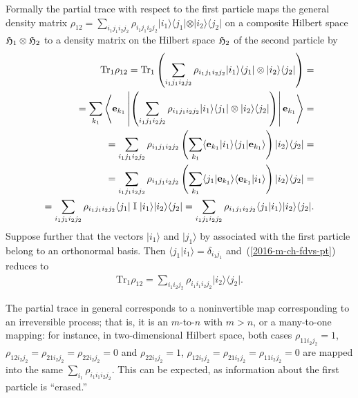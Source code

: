 Formally the partial trace with respect to the first particle
maps the general density matrix
${ \rho}_{12} = \sum_{i_1 j_1 i_2 j_2} \rho_{i_1 j_1 i_2 j_2}   \vert i_1\rangle \langle j_1\vert \otimes \vert i_2\rangle \langle j_2 \vert$
on a composite Hilbert space
$
{\frak H}_1
\otimes
{\frak H}_2
$
to  a density matrix on the Hilbert space
${\frak H}_2
$ of the second particle by
\begin{equation}
\begin{split}
\textrm{Tr}_1
{ \rho}_{12}
= \textrm{Tr}_1  \left(   \sum_{i_1 j_1 i_2 j_2} \rho_{i_1 j_1 i_2 j_2}   \vert i_1\rangle \langle j_1\vert \otimes \vert i_2 \rangle \langle j_2 \vert \right)
=\\
= \sum_{k_1}   \left\langle {\bf e}_{k_1}  \left\vert \left(   \sum_{i_1 j_1 i_2 j_2} \rho_{i_1 j_1 i_2 j_2}
 \vert i_1\rangle \langle j_1\vert \otimes \vert i_2 \rangle \langle j_2 \vert  \right)  \right\vert {\bf e}_{k_1} \right\rangle
=\\
=  \sum_{i_1 j_1 i_2 j_2} \rho_{i_1 j_1 i_2 j_2}  \left( \sum_{k_1}
 \langle {\bf e}_{k_1}  \vert i_1\rangle \langle j_1\vert    {\bf e}_{k_1}  \rangle  \right)  \vert i_2 \rangle \langle j_2 \vert
=\\
=  \sum_{i_1 j_1 i_2 j_2} \rho_{i_1 j_1 i_2 j_2}  \left( \sum_{k_1}
 \langle j_1\vert    {\bf e}_{k_1}  \rangle  \langle {\bf e}_{k_1}  \vert i_1\rangle \right)  \vert i_2 \rangle \langle j_2 \vert
=\\
=  \sum_{i_1 j_1 i_2 j_2} \rho_{i_1 j_1 i_2 j_2}
 \langle j_1\vert   \; {\Bbb I} \; \vert i_1\rangle   \vert i_2 \rangle \langle j_2 \vert
=  \sum_{i_1 j_1 i_2 j_2} \rho_{i_1 j_1 i_2 j_2}
 \langle j_1 \vert  i_1\rangle    \vert i_2 \rangle \langle j_2 \vert
.
\end{split}
\label{2016-m-ch-fdvs-pt}
\end{equation}
Suppose further that the vectors
$\vert i_1 \rangle$
and
$\vert j_1 \rangle$
by   associated with the first particle
belong to an orthonormal basis.
Then $\langle j_1 \vert  i_1\rangle =\delta_{i_1 j_1}$ and~(\ref{2016-m-ch-fdvs-pt})
reduces to
\begin{equation}
\begin{split}
\textrm{Tr}_1
{ \rho}_{12}
=  \sum_{i_1 i_2 j_2} \rho_{i_1 i_1 i_2 j_2}
  \vert i_2 \rangle \langle j_2 \vert
.
\end{split}
\label{2016-m-ch-fdvs-pt2}
\end{equation}

The partial trace in general corresponds to a noninvertible map corresponding to an irreversible process; that is,
it is an $m$-to-$n$ with $m>n$, or a many-to-one mapping:
for instance, in two-dimensional Hilbert space, both cases
$\rho_{1 1 i_2 j_2} = 1$, $\rho_{1 2 i_2 j_2} =   \rho_{2 1 i_2 j_2} =  \rho_{2 2 i_2 j_2} = 0$
and
$\rho_{2 2 i_2 j_2} = 1$, $\rho_{1 2 i_2 j_2} =   \rho_{2 1 i_2 j_2} =  \rho_{1 1 i_2 j_2} = 0$
are mapped into the same  $ \sum_{i_1} \rho_{i_1 i_1 i_2 j_2}$.
This can be expected, as information about the first particle is ``erased.''

